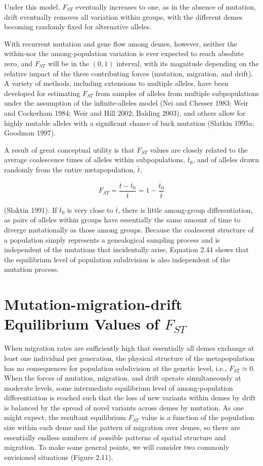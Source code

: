 \documentclass{article}
\begin{document}
Under this model,  $ F_{ST} $ eventually increases to one, as in the absence of mutation, drift eventually removes all variation within groups, with the different demes becoming randomly fixed for alternative alleles.

With recurrent mutation and gene flow among demes, however, neither the within-nor the among-population variation is ever expected to reach absolute zero, and  $ F_{ST} $ will be in the  $ (0,1) $ interval, with its magnitude depending on the relative impact of the three contributing forces (mutation, migration, and drift). A variety of methods, including extensions to multiple alleles, have been developed for estimating  $ F_{ST} $ from samples of alleles from multiple subpopulations under the assumption of the infinite-alleles model (Nei and Chesser 1983; Weir and Cockerham 1984; Weir and Hill 2002; Balding 2003), and others allow for highly mutable alleles with a significant chance of back mutation (Slatkin 1995a; Goodman 1997).

A result of great conceptual utility is that  $ F_{ST} $ values are closely related to the average coalescence times of alleles within subpopulations,  $ \bar{t}_{0} $, and of alleles drawn randomly from the entire metapopulation,  $ \bar{t} $,

\begin{equation}
F_{S T}=\frac{\overline{t}-\overline{t}_{0}}{\overline{t}}=1-\frac{\overline{t}_{0}}{\overline{t}}
\tag{2.44}
\label{eq:2_44}
\end{equation}

(Slaktin 1991). If  $ \bar{t}_{0} $ is very close to  $ \bar{t} $, there is little among-group differentiation, as pairs of alleles within groups have essentially the same amount of time to diverge mutationally as those among groups. Because the coalescent structure of a population simply represents a genealogical sampling process and is independent of the mutations that incidentally arise, Equation 2.44 shows that the equilibrium level of population subdivision is also independent of the mutation process.

\section{Mutation-migration-drift Equilibrium Values of  $ F_{ST} $}
When migration rates are sufficiently high that essentially all demes exchange at least one individual per generation, the physical structure of the metapopulation has no consequences for population subdivision at the genetic level, i.e.,  $ F_{ST} \simeq 0 $. When the forces of mutation, migration, and drift operate simultaneously at moderate levels, some intermediate equilibrium level of among-population differentiation is reached such that the loss of new variants within demes by drift is balanced by the spread of novel variants across demes by mutation. As one might expect, the resultant equilibrium  $ F_{ST} $ value is a function of the population size within each deme and the pattern of migration over demes, so there are essentially endless numbers of possible patterns of spatial structure and migration. To make some general points, we will consider two commonly envisioned situations (Figure 2.11).
\end{document}
